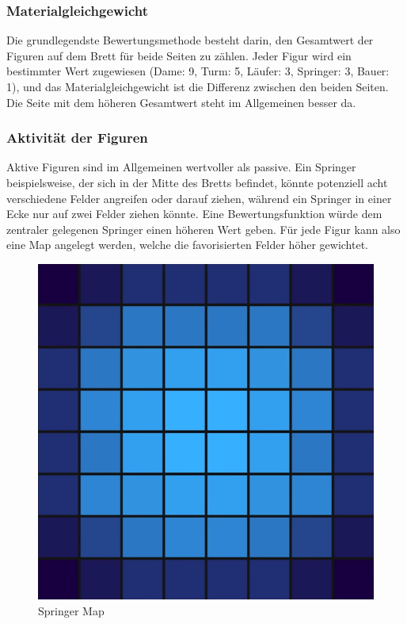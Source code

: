 \subsubsection{Materialgleichgewicht}
Die grundlegendste Bewertungsmethode besteht darin, den Gesamtwert der Figuren auf dem Brett für beide Seiten zu zählen. 
Jeder Figur wird ein bestimmter Wert zugewiesen (Dame: 9, Turm: 5, Läufer: 3, Springer: 3, Bauer: 1), 
und das Materialgleichgewicht ist die Differenz zwischen den beiden Seiten. Die Seite mit dem höheren Gesamtwert steht im Allgemeinen besser da.

\subsubsection{Aktivität der Figuren}
Aktive Figuren sind im Allgemeinen wertvoller als passive. Ein Springer beispielsweise, der sich in der Mitte des Bretts befindet, 
könnte potenziell acht verschiedene Felder angreifen oder darauf ziehen, während ein Springer in einer Ecke nur auf zwei Felder ziehen könnte. 
Eine Bewertungsfunktion würde dem zentraler gelegenen Springer einen höheren Wert geben.
Für jede Figur kann also eine Map angelegt werden, welche die favorisierten Felder höher gewichtet.

\begin{figure}[ht]
    \centering
    \includegraphics[scale=0.3]{images/knight_map.png}
    \caption{Springer Map}
\end{figure}

